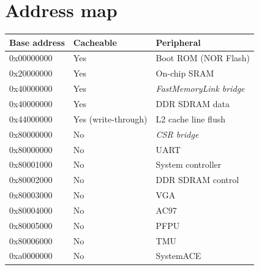 \documentclass[a4paper,11pt]{article}
\begin{document}
\section{Address map}

\begin{tabular}{|l|l|p{10cm}|}
\hline
\bf{Base address} & \bf{Cacheable} & \bf{Peripheral} \\
\hline
0x00000000 & Yes & Boot ROM (NOR Flash) \\
\hline
0x20000000 & Yes & On-chip SRAM \\
\hline
0x40000000 & Yes & \textit{FastMemoryLink bridge} \\
\hline
\hspace{5mm} 0x40000000 & Yes & \hspace{5mm} DDR SDRAM data \\
\hline
\hspace{5mm} 0x44000000 & Yes (write-through) & \hspace{5mm} L2 cache line flush \\
\hline
0x80000000 & No & \textit{CSR bridge} \\
\hline
\hspace{5mm} 0x80000000 & No & \hspace{5mm} UART \\
\hline
\hspace{5mm} 0x80001000 & No & \hspace{5mm} System controller \\
\hline
\hspace{5mm} 0x80002000 & No & \hspace{5mm} DDR SDRAM control \\
\hline
\hspace{5mm} 0x80003000 & No & \hspace{5mm} VGA \\
\hline
\hspace{5mm} 0x80004000 & No & \hspace{5mm} AC97 \\
\hline
\hspace{5mm} 0x80005000 & No & \hspace{5mm} PFPU \\
\hline
\hspace{5mm} 0x80006000 & No & \hspace{5mm} TMU \\
\hline
0xa0000000 & No & SystemACE \\
\hline
\end{tabular}
\end{document}

